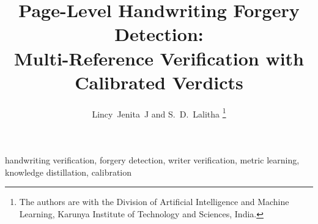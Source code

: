 \documentclass[journal,onecolumn,12pt]{IEEEtran}
\begin{document}
\title{Page-Level Handwriting Forgery Detection:\\
Multi-Reference Verification with Calibrated Verdicts}

\author{Lincy~Jenita~J and S.~D.~Lalitha%
\thanks{The authors are with the Division of Artificial Intelligence and Machine Learning, Karunya Institute of Technology and Sciences, India.}}

\maketitle

\begin{abstract}
\end{abstract}

\begin{IEEEkeywords}
handwriting verification, forgery detection, writer verification, metric learning, knowledge distillation, calibration
\end{IEEEkeywords}







\appendices
{}

\printbibliography
\end{document}
